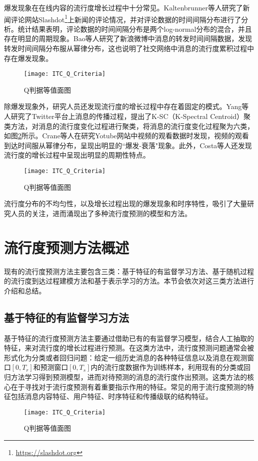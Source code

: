 爆发现象在在线内容的流行度增长过程中十分常见。Kaltenbrunner等人\citep{kaltenbrunner2007description}研究了新闻评论网站Slashdot\footnote{\url{https://slashdot.org}}上新闻的评论情况，并对评论数据的时间间隔分布进行了分析。统计结果表明，评论数据的时间间隔分布是两个log-normal分布的混合，并且存在明显的周期现象。Bao等人\citep{bao2013cumulative}研究了新浪微博中消息的转发时间间隔数据，发现转发时间间隔分布服从幂律分布，这也说明了社交网络中消息的流行度累积过程中存在爆发现象。
\begin{figure}[!htbp]
  \centering
  \texttt{[image: ITC\_Q\_Criteria]}
  \caption{Q判据等值面图}
  \label{fig:burst}
\end{figure}

除爆发现象外，研究人员还发现流行度的增长过程中存在着固定的模式。Yang等人\citep{yang2011patterns}研究了Twitter平台上消息的传播过程，提出了K-SC（K-Spectral Centroid）聚类方法，对消息的流行度变化过程进行聚类，将消息的流行度变化过程聚为六类，如图\ref{fig:pattern}所示。Crane等人\citep{crane2008robust}在研究Yotube网站中视频的观看数据时发现，视频的观看到达时间服从幂律分布，呈现出明显的``爆发-衰落"现象。此外，Costa等人\citep{ferraz2015rsc}还发现流行度的增长过程中呈现出明显的周期性特点。
\begin{figure}[!htbp]
  \centering
  \texttt{[image: ITC\_Q\_Criteria]}
  \caption{Q判据等值面图}
  \label{fig:pattern}
\end{figure}

流行度分布的不均匀性，以及增长过程出现的爆发现象和时序特性，吸引了大量研究人员的关注，进而涌现出了多种流行度预测的模型和方法。
\section{流行度预测方法概述}
现有的流行度预测方法主要包含三类：基于特征的有监督学习方法、基于随机过程的流行度到达过程建模方法和基于表示学习的方法。本节会依次对这三类方法进行介绍和总结。
\subsection{基于特征的有监督学习方法}
基于特征的流行度预测方法主要通过借助已有的有监督学习模型，结合人工抽取的特征，来对流行度的增长过程进行预测。在这类方法中，流行度预测问题通常会被形式化为分类或者回归问题：给定一组历史消息的各种特征信息以及消息在观测窗口$[0,T_r]$和预测窗口$[0,T_s]$内的流行度数据作为训练样本，利用现有的分类或回归方法学习得到预测模型，进而对待预测的消息的流行度作出预测。这类方法的核心在于寻找对于流行度预测有着重要指示作用的特征。常见的用于流行度预测的特征包括消息内容特征、用户特征、时序特征和传播级联的结构特征。
\begin{figure}[!htbp]
  \centering
  \texttt{[image: ITC\_Q\_Criteria]}
  \caption{Q判据等值面图}
  \label{fig:loglinear}
\end{figure}

